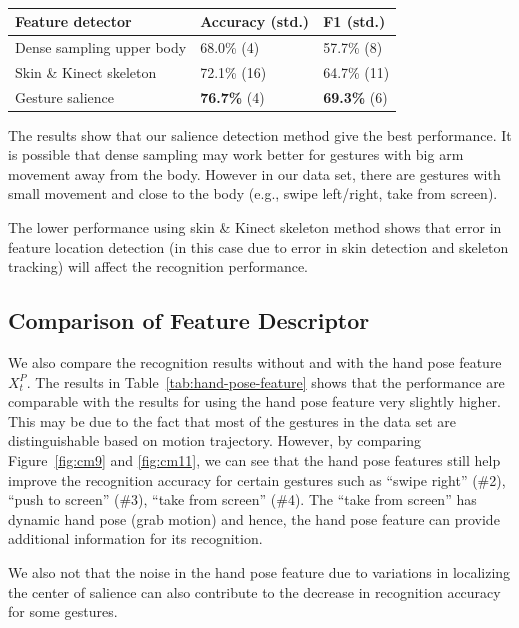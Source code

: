 \documentclass{sigchi}
\newcommand\tabhead[1]{\small\textbf{#1}}
\begin{document}
\begin{table}
\centering
\begin{tabular}{|l|l|l|}
\hline
\tabhead{Feature detector} & {\tabhead{Accuracy (std.)}} & {\tabhead{F1 (std.)}}\\
\hline
Dense sampling upper body & 68.0\% (4) & 57.7\% (8)\\
\hline
Skin \& Kinect skeleton & 72.1\% (16) & 64.7\% (11) \\
\hline
Gesture salience & \textbf{76.7\%} (4) & \textbf{69.3\%} (6) \\
\hline
\end{tabular}
\caption{}
\label{tab:feature-detection}
\end{table}

The results show that our salience detection method give the best performance.
It is possible that dense sampling may work better for gestures with big arm
movement away from the body. However in our data set, there are gestures with
small movement and close to the body (e.g., swipe left/right, take from screen).

The lower performance using skin & Kinect skeleton method shows that error
in feature location detection (in this case due to error in skin detection and
skeleton tracking) will affect the recognition performance.


\subsection{Comparison of Feature Descriptor}
We also compare the recognition results without and with the hand pose feature
$X_t^P$. The results in Table~\ref{tab:hand-pose-feature} shows that the
performance are comparable with the results for using the hand pose feature very
slightly higher. This may be due to the fact that most of the gestures in the
data set are distinguishable based on motion trajectory. However, by comparing
Figure~\ref{fig:cm9} and \ref{fig:cm11}, we can see that the hand pose features
still help improve the recognition accuracy for certain gestures such as ``swipe right'' (\#2), ``push to screen'' (\#3), ``take from screen'' (\#4).
The ``take from screen'' has dynamic hand pose (grab motion) and hence, the hand
pose feature can provide additional information for its recognition.

We also not that the noise in the hand pose feature due to variations in
localizing the center of salience can also contribute to the decrease in
recognition accuracy for some gestures.
\end{document}

